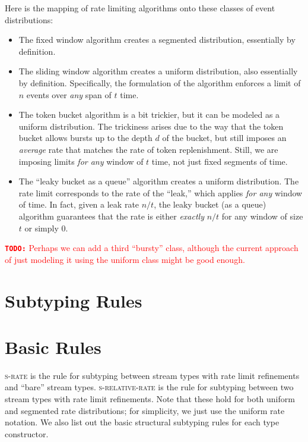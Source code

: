 \documentclass[acmsmall,nonacm,screen]{acmart}
\makeatletter
\newcommand{\rr}[3] {
  {#1}_{\mathsf{@{#2}/{#3}}}
}
\newcommand{\subtype}{\mathrel{<:}}
\newcommand{\todo}[1]{\textcolor{red}{\textbf{\texttt{TODO:}} {#1}}}
\makeatother
\begin{document}
Here is the mapping of rate limiting algorithms onto these classes of event distributions:
\begin{itemize}
  \item The fixed window algorithm creates a segmented distribution, essentially by definition.
  \item The sliding window algorithm creates a uniform distribution, also essentially by definition. Specifically, the formulation of the algorithm enforces a limit of $n$ events over \textit{any} span of $t$ time.
  \item The token bucket algorithm is a bit trickier, but it can be modeled as a uniform distribution. The trickiness arises due to the way that the token bucket allows bursts up to the depth $d$ of the bucket, but still imposes an \textit{average} rate that matches the rate of token replenishment. Still, we are imposing limits \textit{for any} window of $t$ time, not just fixed segments of time.
  \item The ``leaky bucket as a queue'' algorithm creates a uniform distribution. The rate limit corresponds to the rate of the ``leak,'' which applies \textit{for any} window of time. In fact, given a leak rate $n/t$, the leaky bucket (as a queue) algorithm guarantees that the rate is either \textit{exactly} $n/t$ for any window of size $t$ or simply $0$.
\end{itemize}

\todo{Perhaps we can add a third ``bursty'' class, although the current approach of just modeling it using the uniform class might be good enough.}

\section{Subtyping Rules}
\section{Basic Rules}
\textsc{s-rate} is the rule for subtyping between stream types with rate limit refinements and ``bare'' stream types. \textsc{s-relative-rate} is the rule for subtyping between two stream types with rate limit refinements. Note that these hold for both uniform and segmented rate distributions; for simplicity, we just use the uniform rate notation. We also list out the basic structural subtyping rules for each type constructor.
\end{document}
